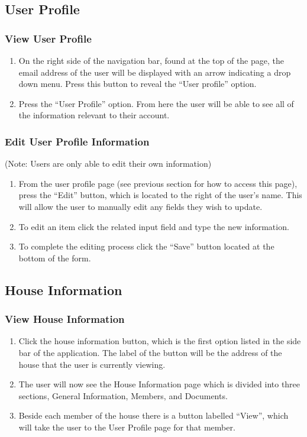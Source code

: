 \documentclass[12pt]{article}
\begin{document}
\subsection{User Profile} %
\subsubsection{View User Profile}
\begin{enumerate}
\item On the right side of the navigation bar, found at the top of the page, the email address of the user will be displayed with an arrow indicating a drop down menu. Press this button to reveal the ``User profile'' option.
\item Press the ``User Profile'' option. From here the user will be able to see all of the information relevant to their account.
\end{enumerate}

\subsubsection{Edit User Profile Information}
(Note: Users are only able to edit their own information)
\begin{enumerate}
\item From the user profile page (see previous section for how to access this page), press the ``Edit'' button, which is located to the right of the user's name. This will allow the user to manually edit any fields they wish to update.
\item To edit an item click the related input field and type the new information.
\item To complete the editing process click the ``Save'' button located at the bottom of the form.
\end{enumerate}

\subsection{House Information} %
\subsubsection{View House Information}
\begin{enumerate}
\item Click the house information button, which is the first option listed in the side bar of the application. The label of the button will be the address of the house that the user is currently viewing.
\item The user will now see the House Information page which is divided into three sections, General Information, Members, and Documents.
\item Beside each member of the house there is a button labelled ``View'', which will take the user to the User Profile page for that member.
\end{enumerate}
\end{document}
